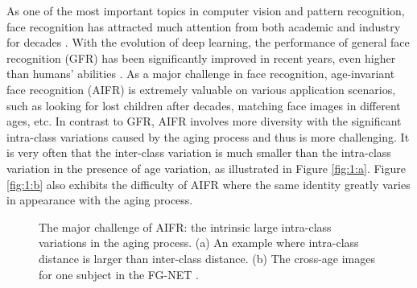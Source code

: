 \documentclass[runningheads]{llncs}
\begin{document}
As one of the most important topics in computer vision and pattern recognition, face recognition has attracted much attention from both academic and industry for decades \cite{tian2007face,turk1991face,Belhumeur:1997,ahonen2006face,wang2004unified,Li05nonparametricsubspace,Li2009NonparametricDA,spatio-temporal,Xiong:2013,liu2004null,liu2004nullkernel}. With the evolution of deep learning, the performance of general face recognition (GFR) has been significantly improved in recent years, even higher than humans' abilities \cite{deepid2,deepid2plus,deepid3,facenet,centerloss,sphereface,cosface}. As a major challenge in face recognition, age-invariant face recognition (AIFR) is extremely valuable on various application scenarios, such as looking for lost children after decades, matching face images in different ages, etc. In contrast to GFR, AIFR involves more diversity with the significant intra-class variations caused by the aging process and thus is more challenging. It is very often that the inter-class variation is much smaller than the intra-class variation in the presence of age variation, as illustrated in Figure \ref{fig:1:a}. Figure \ref{fig:1:b} also exhibits the difficulty of AIFR where the same identity greatly varies in appearance with the aging process.

\begin{figure}[t]
  \centering
  \caption{The major challenge of AIFR: the intrinsic large intra-class variations in the aging process. (a) An example where intra-class distance is larger than inter-class distance. (b) The cross-age images for one subject in the FG-NET \cite{fgnet}.}
  \label{fig:1}
\end{figure}
\end{document}
